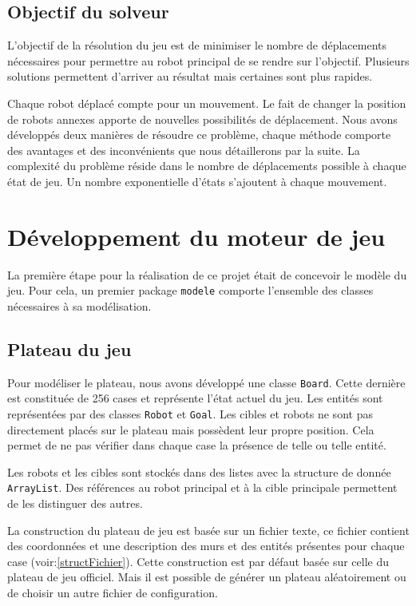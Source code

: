 \documentclass[a4paper]{article} %
\begin{document}
	\subsection{Objectif du solveur}
L'objectif de la résolution du jeu est de minimiser le nombre de déplacements nécessaires pour permettre au robot principal de se rendre sur l'objectif. Plusieurs solutions permettent d'arriver au résultat mais certaines sont plus rapides.

Chaque robot déplacé compte pour un mouvement. Le fait de changer la position de robots annexes apporte de nouvelles possibilités de déplacement. Nous avons développés deux manières de résoudre ce problème, chaque méthode comporte des avantages et des inconvénients que nous détaillerons par la suite. La complexité du problème réside dans le nombre de déplacements possible à chaque état de jeu. Un nombre exponentielle d'états s'ajoutent à chaque mouvement.

\section{Développement du moteur de jeu}
La première étape pour la réalisation de ce projet était de concevoir le modèle du jeu. Pour cela, un premier package \texttt{modele} comporte l'ensemble des classes nécessaires à sa modélisation.

	\subsection{Plateau du jeu}
Pour modéliser le plateau, nous avons développé une classe \texttt{Board}. Cette dernière est constituée de 256 cases et représente l'état actuel du jeu. Les entités sont représentées par des classes \texttt{Robot} et \texttt{Goal}. Les cibles et robots ne sont pas directement placés sur le plateau mais possèdent leur propre position. Cela permet de ne pas vérifier dans chaque case la présence de telle ou telle entité.

Les robots et les cibles sont stockés dans des listes avec la structure de donnée \texttt{ArrayList}. Des références au robot principal et à la cible principale permettent de les distinguer des autres.

La construction du plateau de jeu est basée sur un fichier texte, ce fichier contient des coordonnées et une description des murs et des entités présentes pour chaque case (voir:\ref{structFichier}). Cette construction est par défaut basée sur celle du plateau de jeu officiel. Mais il est possible de générer un plateau aléatoirement ou de choisir un autre fichier de configuration.
\end{document}
